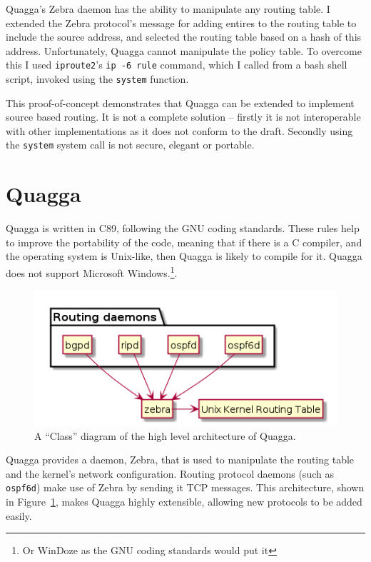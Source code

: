 \documentclass[12pt,a4paper,twoside]{report}
\begin{document}
Quagga's Zebra daemon has the ability to manipulate any routing table. I
extended the Zebra protocol's message for adding entires to the routing table
to include the source address, and selected the routing table based on a hash
of this address. Unfortunately, Quagga cannot manipulate the policy table. To
overcome this I used \texttt{iproute2}'s \texttt{ip -6 rule} command, which I
called from a bash shell script, invoked using the \texttt{system} function. 

This proof-of-concept demonstrates that Quagga can be extended to implement
source based routing. It is not a complete solution -- firstly it is not
interoperable with other implementations as it does not conform to the draft.
Secondly using the \texttt{system} system call is not secure, elegant or
portable. 

\section{Quagga}
Quagga is written in C89, following the GNU coding
standards\cite{gnucodestandards}. These rules help to improve the portability
of the code, meaning that if there is a C compiler, and the operating system is
Unix-like, then Quagga is likely to compile for it.  Quagga does not
support Microsoft Windows.\footnote{Or WinDoze as the GNU coding standards would
put it}.

\begin{figure}
\begin{center}
	\includegraphics[width=0.8\linewidth]{../Diagrams/UML/quaggaZebra/quaggaZebra.png}
	\caption{A ``Class'' diagram of the high level architecture of Quagga.}\label{fig:zebra}
\end{center}
\end{figure}
Quagga provides a daemon, Zebra, that is used to manipulate the routing table
and the kernel's network configuration. Routing protocol daemons (such as
\texttt{ospf6d}) make use of Zebra by sending it
TCP messages. This
architecture, shown in Figure~\ref{fig:zebra}, makes Quagga highly extensible,
allowing new protocols to be added easily.
\end{document}
